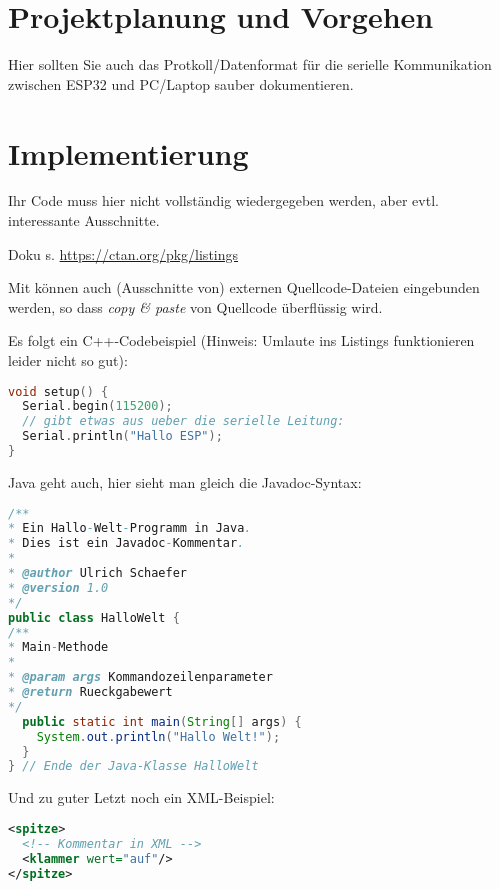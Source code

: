 \documentclass[12pt,oneside]{article}
\begin{document}
  
  \section{Projektplanung und Vorgehen}

  
  Hier sollten Sie auch das Protkoll/Datenformat für die serielle Kommunikation zwischen ESP32 und PC/Laptop sauber dokumentieren.
  
  \section{Implementierung}
  
  
  
  Ihr Code muss hier nicht vollständig wiedergegeben werden, aber evtl. interessante Ausschnitte.
  
  Doku s. \url{https://ctan.org/pkg/listings}
  
  Mit \verb|| können auch (Ausschnitte von) 
  externen Quellcode-Dateien eingebunden werden, so dass \emph{copy \& paste} von Quellcode
  überflüssig wird.
  
Es folgt ein C++-Codebeispiel (Hinweis: Umlaute ins Listings funktionieren leider nicht so gut):
\begin{lstlisting}[language=C++]
void setup() {
  Serial.begin(115200);
  // gibt etwas aus ueber die serielle Leitung:
  Serial.println("Hallo ESP");
}
\end{lstlisting}


Java geht auch, hier sieht man gleich die Javadoc-Syntax:
\begin{lstlisting}[language=Java]
/**
* Ein Hallo-Welt-Programm in Java.
* Dies ist ein Javadoc-Kommentar.
*
* @author Ulrich Schaefer
* @version 1.0
*/
public class HalloWelt {
/**
* Main-Methode
*
* @param args Kommandozeilenparameter
* @return Rueckgabewert
*/
  public static int main(String[] args) {
    System.out.println("Hallo Welt!");
  }
} // Ende der Java-Klasse HalloWelt
\end{lstlisting}


Und zu guter Letzt noch ein XML-Beispiel: 
\begin{lstlisting}[language=XML]
<spitze>
  <!-- Kommentar in XML -->
  <klammer wert="auf"/>
</spitze>
\end{lstlisting}


  
\end{document}
